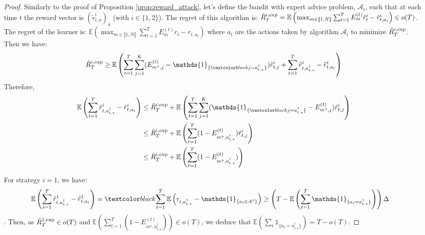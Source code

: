 \begin{proof}
Similarly to the proof of Proposition \ref{prop:reward_attack}, let's define the bandit with expert advice problem, $\mathcal{A}_{i}$, such that at each time $t$ the reward vector is $(\tilde{r}^{i}_{t,a})_{a}$ (with $i\in\{1, 2\}$). The regret of this algorithm is: $\Tilde{R}_{T}^{i,\text{exp}} = \mathbb{E}\left( \max_{m\in \llbracket 1, N \rrbracket}\sum_{t=1}^{T} E_{m}^{(t)}\Tilde{r}^i_{t} - \Tilde{r}^i_{t,a_{t}}\right)\in o(T)$. The regret of the learner is: $\mathbb{E}\left( \max_{m\in \llbracket 1, N \rrbracket}\sum_{t=1}^{T} E_{m}^{(t)}r_{t} - r_{t,a_{t}}\right)$ where $a_t$ are the actions taken by algorithm $\mathcal{A}_i$ to minimize $\Tilde{R}_{T}^{i,\text{exp}}$. Then we have:
\begin{align*}
    \Tilde{R}_{T}^{i,\text{exp}} \geq \mathbb{E}\left(\sum_{t=1}^{T}\sum_{j=1}^{K} (E_{m^{\star}, j}^{(t)} - \mathds{1}_{\{\changee{j = a_{t,\star}^{\dagger}}\}})\tilde{r}_{t,j}^{i} + \sum_{t=1}^{T} \tilde{r}^{i}_{t, a^{\dagger}_{t,\star}} - \tilde{r}^{i}_{t,a_{t}} \right)
\end{align*}
Therefore, 
\begin{align*}
  \mathbb{E}\left(\sum_{t=1}^{T} \tilde{r}^{i}_{t, a^{\dagger}_{t, \star}} - \tilde{r}^{i}_{t,a_{t}} \right) &\leq \Tilde{R}_{T}^{i,\text{exp}} + \mathbb{E}\left(\sum_{t=1}^{T}\sum_{j=1}^{K} (\mathds{1}_{\{\changee{j = a_{t,\star}^{\dagger}}\}} - E_{m^{\star}, j}^{(t)})\tilde{r}_{t,j}^{i}\right) \\
  &\leq \Tilde{R}_{T}^{i,\text{exp}} + \mathbb{E}\left(\sum_{t=1}^{T}(1 - E_{m^{\star}, a^{\dagger}_{t,\star}}^{(t)})\tilde{r}_{t,j}^{i}\right) \\
  &\leq \Tilde{R}_{T}^{i,\text{exp}} + \mathbb{E}\left(\sum_{t=1}^{T}(1 - E_{m^{\star}, a^{\dagger}_{t,\star}}^{(t)})\right)
\end{align*}

For strategy $i=1$, we have:
\begin{align*}
    \mathbb{E}\left(\sum_{t=1}^{T} \tilde{r}^{1}_{t, a^{\dagger}_{t, \star}} - \tilde{r}^{1}_{t,a_{t}} \right) &=
    \changee{\sum_{t=1}^{T} \mathbb{E}\left(r_{t,a_{t,\star}^{\dagger}} - \mathds{1}_{\{ a_{t}\in A^{\dagger}\}}\right)\geq \left(T-\mathbb{E}\left(\sum_{t=1}^{T} \mathds{1}_{\{ a_{t} = a_{t,\star}^{\dagger}\}}\right)\right)\Delta}
\end{align*}
. Then, as $\Tilde{R}_{T}^{1,\text{exp}}\in o(T)$ and $\mathbb{E}\left(\sum_{t=1}^{T}(1 - E_{m^{\star}, a^{\dagger}_{t, \star}}^{(t)})\right)\in o(T)$, we deduce that $\mathbb{E}(\sum_{t} \mathds{1}_{\{ a_{t} = a_{t,\star}
^{\dagger}\}}) = T-o(T)$. 


\end{proof}
